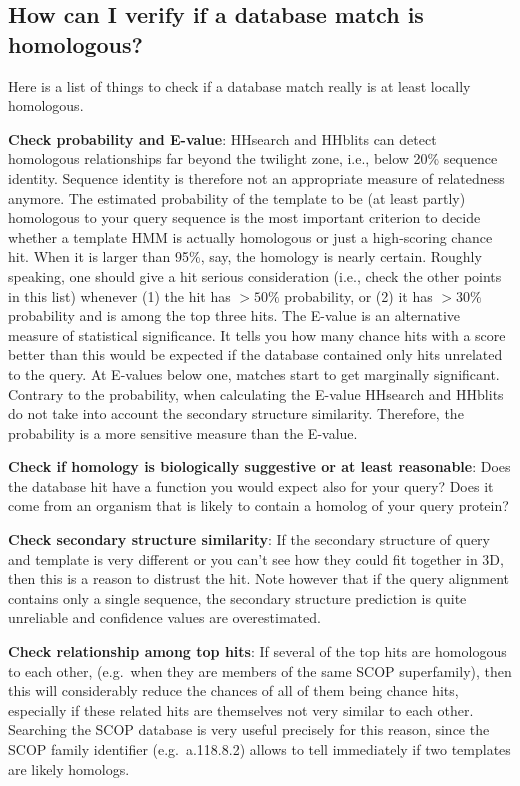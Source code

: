 \documentclass[11pt,a4paper]{article}
\begin{document}
\subsection{How can I verify if a database match is homologous?}
Here is a list of things to check if a database match really is at least locally homologous.
 
{\bf Check probability and E-value}:
HHsearch and HHblits can detect homologous relationships far beyond the twilight zone, i.e., below 20\% sequence identity. Sequence identity is therefore not an appropriate measure of relatedness anymore. The estimated probability of the template to be (at least partly) homologous to your query sequence is the most important criterion to decide whether a template HMM is actually homologous or just a high-scoring chance hit. When it is larger than 95\%, say, the homology is nearly certain. Roughly speaking, one should give a hit serious consideration (i.e., check the other points in this list) whenever (1) the hit has $>50\%$ probability, or (2) it has $>30\%$ probability and is among the top three hits. The E-value is an alternative measure of statistical significance. It tells you how many chance hits with a score better than this would be expected if the database contained only hits unrelated to the query. At E-values below one, matches start to get marginally significant. Contrary to the probability, when calculating the E-value HHsearch and HHblits do not take into account the secondary structure similarity. Therefore, the probability is a more sensitive measure than the E-value.

{\bf Check if homology is biologically suggestive or at least reasonable}:
Does the database hit have a function you would expect also for your query? Does it come from an organism that is likely to contain a homolog of your query protein?

{\bf Check secondary structure similarity}:
If the secondary structure of query and template is very different or you can't see how they could fit together in 3D, then this is a reason to distrust the hit. Note however that if the query alignment contains only a single sequence, the secondary structure prediction is quite unreliable and confidence values are overestimated.

{\bf Check relationship among top hits}: 
If several of the top hits are homologous to each other, (e.g.\ when they are members of the same SCOP superfamily), then this will considerably reduce the chances of all of them being chance hits, especially if these related hits are themselves not very similar to each other. Searching the SCOP database is very useful precisely for this reason, since the SCOP family identifier (e.g.\ a.118.8.2) allows to tell immediately if two templates are likely homologs.
\end{document}
